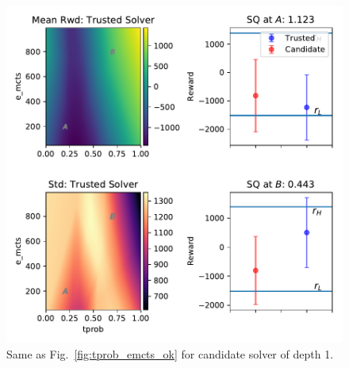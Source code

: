 \begin{figure}[tbp]
    \centering
    \includegraphics[width=0.9\linewidth]{Figures/transition_e_vary_e_mctstprob_bad.pdf}
    \caption{Same as Fig.~\ref{fig:tprob_emcts_ok} for candidate solver of depth 1.}
    \label{fig:tprob_emcts_bad}
\end{figure}
